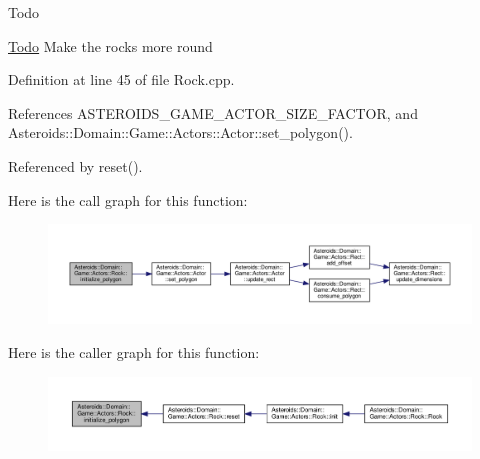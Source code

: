 \begin{DoxyRefDesc}{Todo}
\item[\hyperlink{todo__todo000002}{Todo}]Make the rocks more round \end{DoxyRefDesc}


Definition at line 45 of file Rock.\+cpp.



References A\+S\+T\+E\+R\+O\+I\+D\+S\+\_\+\+G\+A\+M\+E\+\_\+\+A\+C\+T\+O\+R\+\_\+\+S\+I\+Z\+E\+\_\+\+F\+A\+C\+T\+OR, and Asteroids\+::\+Domain\+::\+Game\+::\+Actors\+::\+Actor\+::set\+\_\+polygon().



Referenced by reset().

Here is the call graph for this function\+:\nopagebreak
\begin{figure}[H]
\begin{center}
\leavevmode
\includegraphics[width=350pt]{classAsteroids_1_1Domain_1_1Game_1_1Actors_1_1Rock_aa2a9c917715b56e4584f514c930c4690_cgraph}
\end{center}
\end{figure}
Here is the caller graph for this function\+:\nopagebreak
\begin{figure}[H]
\begin{center}
\leavevmode
\includegraphics[width=350pt]{classAsteroids_1_1Domain_1_1Game_1_1Actors_1_1Rock_aa2a9c917715b56e4584f514c930c4690_icgraph}
\end{center}
\end{figure}
\mbox{\label{classAsteroids_1_1Domain_1_1Game_1_1Actors_1_1Rock_aab44647e08659d563aeb28d51868fb86}} 
